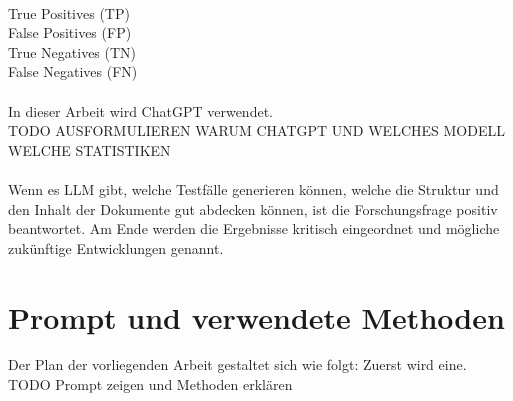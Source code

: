 \documentclass[12pt,toc=bib,toc=listof]{scrreprt}
\begin{document}
\\
True Positives (TP)\\
False Positives (FP)\\
True Negatives (TN)\\ 
False Negatives (FN)\\
\\
In dieser Arbeit wird ChatGPT verwendet.\\
TODO AUSFORMULIEREN WARUM CHATGPT UND WELCHES MODELL WELCHE STATISTIKEN\\
\\
Wenn es LLM gibt, welche Testfälle generieren können, welche die Struktur und den Inhalt der Dokumente gut abdecken können, ist die Forschungsfrage positiv beantwortet. Am Ende werden die Ergebnisse kritisch eingeordnet und mögliche zukünftige Entwicklungen genannt.

\section{Prompt und verwendete Methoden} %
\label{sec:promptUndVerwendeteMethoden}
Der Plan der vorliegenden Arbeit gestaltet sich wie folgt: Zuerst wird eine.
TODO Prompt zeigen und Methoden erklären
\end{document}
